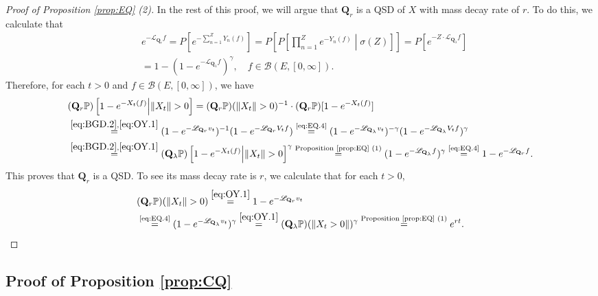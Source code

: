 \documentclass[12pt,a4paper]{amsart}
\numberwithin{equation}{section}
\theoremstyle{plain}
\theoremstyle{definition}
\theoremstyle{remark}
\begin{document}
\begin{proof}[Proof of Proposition \ref{prop:EQ} (2)]
	In the rest of this proof, we will argue that $\mathbf Q_r$ is a QSD of $X$ with mass decay rate of $r$.
	 To do this, we calculate that
	\begin{align}
	&e^{- \mathscr L_{\mathbf Q_r} f}
	= P[ e^{-\sum_{n=1}^Z Y_n(f)} ] 	
	= P\left[P\left[ \prod_{n=1}^Z e^{-Y_n(f)} \middle | \sigma(Z)\right]\right]
	= P \left[ e^{-Z \cdot \mathscr L_{\mathbf Q_\lambda } f}\right]
	\\&= 1 - (1 - e^{- \mathscr L_{\mathbf Q_\lambda} f})^\gamma, \quad f\in \mathcal B(E,[0,\infty]).  \label{eq:EQ.4}
	\end{align}
	Therefore, for each $t> 0$ and $f\in \mathcal B(E,[0,\infty])$, we have
	\begin{align}
	&(\mathbf Q_r \mathbb P)\left[ 1 - e^{-X_t (f)} \middle|\|X_t\|>0 \right]
	= (\mathbf Q_r \mathbb P)(\|X_t\| >0)^{-1} \cdot (\mathbf Q_r \mathbb P) [1 - e^{- X_t(f)}]
	\\&\overset{\eqref{eq:BGD.2}, \eqref{eq:OY.1}}= (1 - e^{- \mathscr L_{\mathbf Q_r} v_t})^{-1}  (1 - e^{- \mathscr L_{\mathbf Q_r} V_tf})
	\overset{\text{\eqref{eq:EQ.4}}}= (1 - e^{- \mathscr L_{\mathbf Q_\lambda} v_t})^{-\gamma}(1 - e^{- \mathscr L_{\mathbf Q_\lambda} V_tf})^{\gamma}
	\\&\overset{\eqref{eq:BGD.2}, \eqref{eq:OY.1}}= (\mathbf Q_\lambda \mathbb P)\left[1 - e^{- X_t(f)}\middle| \|X_t\|>0\right]^{\gamma}
	\overset{\text{Proposition \ref{prop:EQ} (1)}}= (1 - e^{- \mathscr L_{\mathbf Q_\lambda} f})^{\gamma}
	\overset{\text{\eqref{eq:EQ.4}}}= 1 - e^{- \mathscr L_{\mathbf Q_r} f}.
	\end{align}
This proves that $\mathbf Q_r$ is a QSD.
	To see its mass decay rate is $r$, we calculate that for each $t>0$,
\begin{align}
	&(\mathbf Q_r \mathbb P)(\|X_t\|>0)
	\overset{\eqref{eq:OY.1}}= 1 - e^{- \mathscr L_{\mathbf Q_r} v_t}
	\\& \overset{\text{\eqref{eq:EQ.4}}}= (1 - e^{- \mathscr L_{\mathbf Q_\lambda} v_t})^\gamma
	\overset{\eqref{eq:OY.1}}= (\mathbf Q_\lambda \mathbb P) (\|X_t > 0\|)^\gamma \overset{\text{Proposition \ref{prop:EQ} (1)}}= e^{ r t}. \qedhere
\end{align}
\end{proof}

\subsection{Proof of Proposition \ref{prop:CQ}} \label{sec:CQ}
\end{document}

